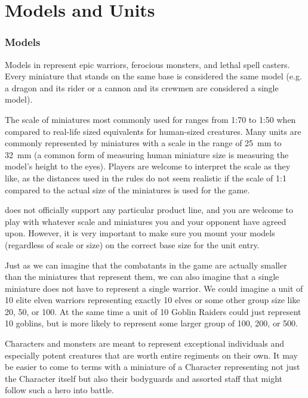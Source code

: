
\part{Models and Units}
\label{models_and_units}

\RBbmc

\section{Models}
\label{models}

Models in \nameofthegame{} represent epic warriors, ferocious monsters, and lethal spell casters. Every miniature that stands on the same base is considered the same model (e.g. a dragon and its rider or a cannon and its crewmen are considered a single model).

The scale of miniatures most commonly used for \theninthage{} ranges from 1:70 to 1:50 when compared to real-life sized equivalents for human-sized creatures. Many units are commonly represented by miniatures with a scale in the range of \SI{25}{mm} to \SI{32}{mm} (a common form of measuring human miniature size is measuring the model's height to the eyes). Players are welcome to interpret the scale as they like, as the distances used in the rules do not seem realistic if the scale of 1:1 compared to the actual size of the miniatures is used for the game.

\theninthage{} does not officially support any particular product line, and you are welcome to play with whatever scale and miniatures you and your opponent have agreed upon. However, it is very important to make sure you mount your models (regardless of scale or size) on the correct base size for the unit entry.

Just as we can imagine that the combatants in the game are actually smaller than the miniatures that represent them, we can also imagine that a single miniature does not have to represent a single warrior. We could imagine a unit of 10 elite elven warriors representing exactly 10 elves or some other group size like 20, 50, or 100. At the same time a unit of 10 Goblin Raiders could just represent 10 goblins, but is more likely to represent some larger group of 100, 200, or 500.

Characters and monsters are meant to represent exceptional individuals and especially potent creatures that are worth entire regiments on their own. It may be easier to come to terms with a miniature of a Character representing not just the Character itself but also their bodyguards and assorted staff that might follow such a hero into battle.

